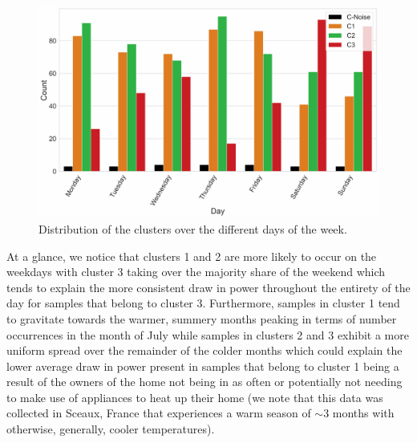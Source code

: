 \begin{adjustwidth}{-1.65cm}{-0.0cm}
\begin{enumerate}[label=Step 2.\arabic*:, leftmargin=*]
        \begin{figure}[H]
            \centering
            \includegraphics[width=\textwidth]{Images/Chapter 6/UCID/UCID-HDBSCAN-V3.pdf}
            \caption{Distribution of the clusters over the different days of the week.}
            \label{fig:UCID-HDBSCAN-V3}
        \end{figure}
        
        \noindent \newline At a glance, we notice that clusters 1 and 2 are more likely to occur on the weekdays with cluster 3 taking over the majority share of the weekend which tends to explain the more consistent draw in power throughout the entirety of the day for samples that belong to cluster 3. Furthermore, samples in cluster 1 tend to gravitate towards the warmer, summery months peaking in terms of number occurrences in the month of July while samples in clusters 2 and 3 exhibit a more uniform spread over the remainder of the colder months which could explain the lower average draw in power present in samples that belong to cluster 1 being a result of the owners of the home not being in as often or potentially not needing to make use of appliances to heat up their home (we note that this data was collected in Sceaux, France that experiences a warm season of $\sim \! 3$  months with otherwise, generally, cooler temperatures). 
        

\end{enumerate}
\end{adjustwidth}
